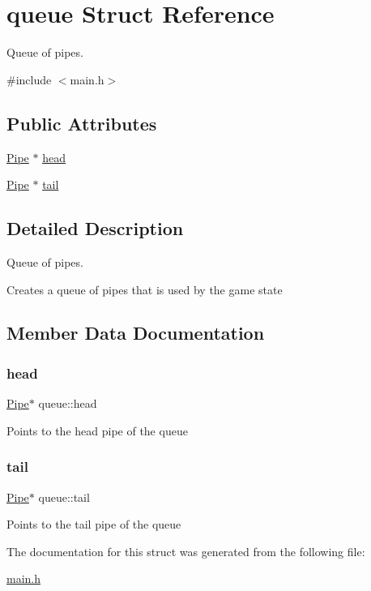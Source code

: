 \hypertarget{structqueue}{}\section{queue Struct Reference}
\label{structqueue}


Queue of pipes.  




{\ttfamily \#include $<$main.\+h$>$}

\subsection*{Public Attributes}
\begin{DoxyCompactItemize}
\item 
\hyperlink{struct_pipe}{Pipe} $\ast$ \hyperlink{structqueue_a52df3ef3f6a262e44f861a66e2da20ad}{head}
\item 
\hyperlink{struct_pipe}{Pipe} $\ast$ \hyperlink{structqueue_a773415a5f961029cba2297a84a5015c0}{tail}
\end{DoxyCompactItemize}


\subsection{Detailed Description}
Queue of pipes. 

Creates a queue of pipes that is used by the game state 

\subsection{Member Data Documentation}
\mbox{\label{structqueue_a52df3ef3f6a262e44f861a66e2da20ad}} 
\subsubsection{\texorpdfstring{head}{head}}
{\footnotesize\ttfamily \hyperlink{struct_pipe}{Pipe}$\ast$ queue\+::head}

Points to the head pipe of the queue \mbox{\label{structqueue_a773415a5f961029cba2297a84a5015c0}} 
\subsubsection{\texorpdfstring{tail}{tail}}
{\footnotesize\ttfamily \hyperlink{struct_pipe}{Pipe}$\ast$ queue\+::tail}

Points to the tail pipe of the queue 

The documentation for this struct was generated from the following file\+:\begin{DoxyCompactItemize}
\item 
\hyperlink{main_8h}{main.\+h}\end{DoxyCompactItemize}
